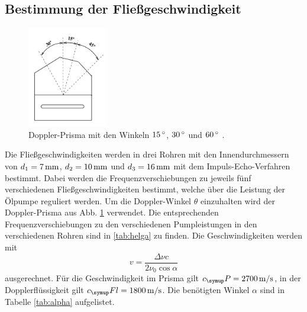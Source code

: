 \subsection{Bestimmung der Fließgeschwindigkeit}
\begin{figure}
  \centering
  \includegraphics[width=3.5cm]{bilder/winkel.png}
  \caption{Doppler-Prisma mit den Winkeln $15\,\si{\degree}$, $30\,\si{\degree}$ und $60\,\si{\degree}$ \cite{us3}.}
  \label{fig:prisma}
\end{figure}
Die Fließgeschwindigkeiten werden in drei Rohren mit den Innendurchmessern von
$d_1 = 7\,\si{\milli\meter}$, $d_2 = 10\,\si{\milli\meter}$ und $d_3=16\,\si{\milli\meter}$ mit dem Impuls-Echo-Verfahren bestimmt.
Dabei werden die Frequenzverschiebungen zu jeweils fünf verschiedenen
Fließgeschwindigkeiten bestimmt, welche über die Leistung der Ölpumpe reguliert werden.
Um die Doppler-Winkel $\theta$ einzuhalten wird der Doppler-Prisma aus Abb. \ref{fig:prisma} verwendet.
Die entsprechenden Frequenzverschiebungen zu den verschiedenen Pumpleistungen in den verschiedenen Rohren sind in \ref{tab:helga} zu finden.
Die Geschwindigkeiten werden mit
\begin{equation}
  v = \frac{\Delta \nu c}{2 \nu_0 \cos{\alpha}} \label{eqn:v}
\end{equation}
ausgerechnet. Für die Geschwindigkeit im Prisma gilt $c_\su{P}= 2700\vel$, in der
Dopplerflüssigkeit gilt $c_\su{Fl}=1800\vel$. Die benötigten Winkel $\alpha$ sind in Tabelle \ref{tab:alpha} aufgelistet.
